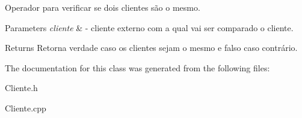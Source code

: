 Operador para verificar se dois clientes são o mesmo. 


\begin{DoxyParams}{Parameters}
{\em cliente} & -\/ cliente externo com a qual vai ser comparado o cliente. \\
\hline
\end{DoxyParams}
\begin{DoxyReturn}{Returns}
Retorna verdade caso os clientes sejam o mesmo e falso caso contrário. 
\end{DoxyReturn}


The documentation for this class was generated from the following files\+:\begin{DoxyCompactItemize}
\item 
Cliente.\+h\item 
Cliente.\+cpp\end{DoxyCompactItemize}
